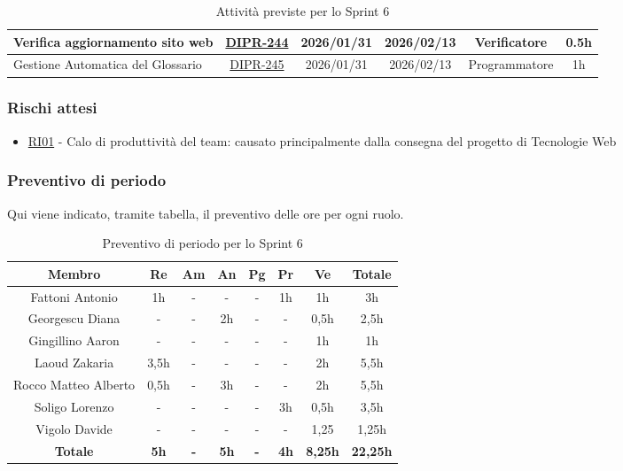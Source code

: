 \documentclass[a4paper,12pt]{article}
\begin{document}
\begin{table}[H]
\begin{adjustwidth}{-4cm}{-4cm}
\begin{spacing}{1}
\begin{tabular}{|p{4cm}|c|c|c|c|c|}
        \hline
        Verifica aggiornamento sito web & \href{https://7zpus.atlassian.net/browse/DIPR-244}{DIPR-244} & 2026/01/31 & 2026/02/13 & Verificatore & 0.5h \\
        \hline
        Gestione Automatica del Glossario & \href{https://7zpus.atlassian.net/browse/DIPR-245}{DIPR-245} & 2026/01/31 & 2026/02/13 & Programmatore & 1h \\
        \hline
    \end{tabular}
    \end{spacing}
    \caption{Attività previste per lo Sprint 6}
    \end{adjustwidth}
\end{table}

\subsubsection{Rischi attesi}
\begin{itemize}
    \item \hyperref[RI01]{RI01} - Calo di produttività del team: causato principalmente dalla consegna del progetto di Tecnologie Web
\end{itemize}

\subsubsection{Preventivo di periodo}
Qui viene indicato, tramite tabella, il preventivo delle ore per ogni ruolo.
\begin{table}[H]
    \begin{adjustwidth}{-4cm}{-4cm}
    \centering
    \begin{tabular}{|c|c|c|c|c|c|c|c|}
        \hline
        \textbf{Membro}& \textbf{Re} & \textbf{Am} & \textbf{An} & \textbf{Pg} & \textbf{Pr} & \textbf{Ve} & \textbf{Totale} \\
        \hline
        Fattoni Antonio & 1h & - & - & - & 1h & 1h & 3h \\
        \hline
        Georgescu Diana & - & - & 2h & - & - & 0,5h & 2,5h \\
        \hline
        Gingillino Aaron & - & - & - & - & - & 1h & 1h \\
        \hline
        Laoud Zakaria & 3,5h & - & - & - & - & 2h & 5,5h \\
        \hline
        Rocco Matteo Alberto & 0,5h & - & 3h & - & - & 2h & 5,5h \\
        \hline
        Soligo Lorenzo & - & - & - & - & 3h & 0,5h & 3,5h \\
        \hline
        Vigolo Davide & - & - & - & - & - & 1,25 & 1,25h \\
        \hline
        \textbf{Totale} & \textbf{5h} & \textbf{-} & \textbf{5h} & \textbf{-} & \textbf{4h} & \textbf{8,25h} & \textbf{22,25h} \\
        \hline
    \end{tabular}
    \caption{Preventivo di periodo per lo Sprint 6}
    \end{adjustwidth}
\end{table}
\end{document}

